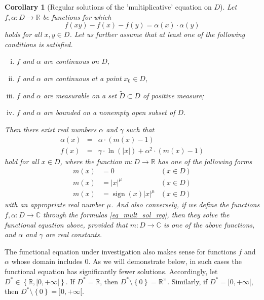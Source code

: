 \documentclass[a4paper,12pt]{article}
\theoremstyle{plain}
\newtheorem{cor}{Corollary}
\theoremstyle{definition}
\theoremstyle{remark}
\begin{document}
\begin{cor}[Regular solutions of the 'multiplicative' equation on $D$]
 Let  $f, \alpha \colon D \to \mathbb{R}$ be functions for which 
 \begin{equation}\label{eq_mult_reg}
  f(xy)-f(x)-f(y)= \alpha(x)\cdot \alpha(y)
 \end{equation}
 holds for all $x, y\in D$.
 Let us further assume that at least one of the following conditions is satisfied.
\begin{enumerate}[(i)]
 \item $f$ and $\alpha$ are continuous on $D$, 
 \item $f$ and $\alpha$ are continuous at a point $x_{0}\in D$, 
 \item $f$ and $\alpha$ are measurable on a set $\tilde{D}\subset D$ of positive measure; 
 \item $f$ and $\alpha$ are bounded on a nonempty open subset of $D$. 
\end{enumerate}  
 Then there exist real numbers  $\alpha$ and $\gamma$ such that 
 \begin{equation}\label{eq_mult_sol_reg}
 \begin{array}{rcl}
 \alpha(x)&=& \alpha\cdot (m(x)-1)\\
  f(x)&=& \gamma \cdot \ln(|x|)+\alpha^{2}\cdot (m(x)-1)
  \end{array}
   \end{equation}
 hold for all $x\in D$, where the function $m\colon D\to \mathbb{R}$ has one of the following forms
 \begin{align*}
m(x)&=0 & (x\in D)\\
m(x)&= |x|^{\mu} & (x\in D)\\
m(x)&= \operatorname{sign}(x) |x|^{\mu} & (x\in D)
 \end{align*}
 with an appropriate real number $\mu$. 
 And also conversely, if we define the functions $f, \alpha \colon D\to \mathbb{C}$ through the formulas \eqref{eq_mult_sol_reg}, then they solve the functional  equation above, provided that $m\colon D\to \mathbb{C}$ is one of the above functions,  and $\alpha$ and $\gamma$ are real constants.  
\end{cor}


The functional equation under investigation also makes sense for functions $f$ and $\alpha$ whose domain includes $0$. As we will demonstrate below, in such cases the functional equation has significantly fewer solutions. Accordingly, let 
 $D^{\ast}\in \left\{\mathbb{R}, [0, +\infty[\right\}$. 
 If $D^{\ast}=\mathbb{R}$, then $D^{\ast}\setminus \left\{ 0\right\} =\mathbb{R}^{\times}$. 
 Similarly, if $D^{\ast}=[0, +\infty[$, then $D^{\ast}\setminus \left\{ 0\right\} =]0, +\infty[$. 
 
\end{document}
